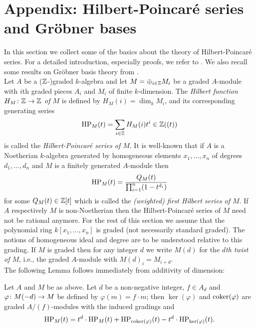 \section{Appendix: Hilbert-Poincar\'e series and Gr\"obner bases}\label{appendix}
In this section we collect some of the basics about the theory of
Hilbert-Poincar\'{e} series. For a detailed introduction, especially
proofs, we refer to \cite{greuel_pfister}. We also recall some results on Gr\"obner basis theory from \cite{Cox_Little_Oshea}.\\

Let $A$ be a ($\mathbb{Z}$-)graded $k$-algebra and let $M=\oplus_{i\in \mathbb{Z}} M_i$ be a
graded $A$-module with $i$th graded pieces $A_i$ and $M_i$ of finite
$k$-dimension. The {\it Hilbert function $H_M\colon \mathbb{Z} \rightarrow \mathbb{Z}$ of $M$}
is defined by $H_M(i)= \dim_k M_i$, and its corresponding generating
series $$\operatorname{HP}_M(t)=\sum_{i\in \mathbb{Z}}H_M(i)t^i \in \mathbb{Z}((t))$$ is
called the {\it Hilbert-Poincar\'{e} series of $M$}. It is well-known
that if $A$ is a Noetherian $k$-algebra generated by homogeneous
elements $x_1, \ldots, x_n$ of degrees $d_1,\ldots, d_n$ and $M$ is a finitely
generated $A$-module
then $$\operatorname{HP}_M(t)=\frac{Q_M(t)}{\prod_{i=1}^n(1-t^{d_i})}$$ for some
$Q_M(t) \in \mathbb{Z}[t]$ which is called the {\it (weighted) first Hilbert
 series of $M$}. If $A$ respectively $M$ is non-Noetherian then the
Hilbert-Poincar\'{e} series of $M$ need not be rational anymore. For
the rest of this section we assume that the polynomial ring
$k[x_1,\ldots, x_n]$ is graded (not necessarily standard graded). The
notions of homogeneous ideal and degree are to be understood
relative to this grading. If $M$ is graded then for any integer $d$ we
write $M(d)$ for the {\it $d$th twist of $M$}, i.e., the graded
$A$-module with $M(d)_i=M_{i+d}$.\\

The following Lemma follows immediately from additivity of dimension:  

\begin{samepage}
\begin{Lem}\label{lem:hilbert_trick_1}
  Let $A$ and $M$ be as above. Let $d$ be a non-negative integer,
  $f\in A_d$ and $\varphi\colon M(-d)\rightarrow M$ be defined by $\varphi(m)
  = f\cdot m$; then $\ker(\varphi)$ and $\textnormal{coker}(\varphi)$ are graded
  $A/(f)$-modules with the induced gradings and $$\operatorname{HP}_M(t) = t^d\cdot
  \operatorname{HP}_M(t) + \operatorname{HP}_{\textnormal{coker}(\varphi)}(t) - t^d\cdot \operatorname{HP}_{\ker(\varphi)}(t).$$
\end{Lem}
\end{samepage}

